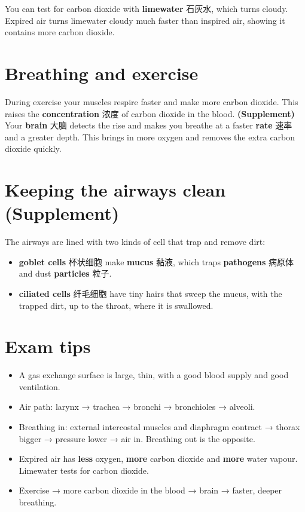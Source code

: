 \documentclass[11pt]{article}
\begin{document}
You can test for carbon dioxide with \textbf{limewater} 石灰水, which turns cloudy. Expired air turns limewater cloudy much faster than inspired air, showing it contains more carbon dioxide.

\section*{Breathing and exercise}

During exercise your muscles respire faster and make more carbon dioxide. This raises the \textbf{concentration} 浓度 of carbon dioxide in the blood. \textbf{(Supplement)} Your \textbf{brain} 大脑 detects the rise and makes you breathe at a faster \textbf{rate} 速率 and a greater depth. This brings in more oxygen and removes the extra carbon dioxide quickly.

\section*{Keeping the airways clean (Supplement)}

The airways are lined with two kinds of cell that trap and remove dirt:

\begin{itemize}
\item \textbf{goblet cells} 杯状细胞 make \textbf{mucus} 黏液, which traps \textbf{pathogens} 病原体 and dust \textbf{particles} 粒子.

\item \textbf{ciliated cells} 纤毛细胞 have tiny hairs that sweep the mucus, with the trapped dirt, up to the throat, where it is swallowed.

\end{itemize}

\section*{Exam tips}

\begin{itemize}
\item A gas exchange surface is large, thin, with a good blood supply and good ventilation.

\item Air path: larynx → trachea → bronchi → bronchioles → alveoli.

\item Breathing in: external intercostal muscles and diaphragm contract → thorax bigger → pressure lower → air in. Breathing out is the opposite.

\item Expired air has \textbf{less} oxygen, \textbf{more} carbon dioxide and \textbf{more} water vapour. Limewater tests for carbon dioxide.

\item Exercise → more carbon dioxide in the blood → brain → faster, deeper breathing.

\end{itemize}
\end{document}
